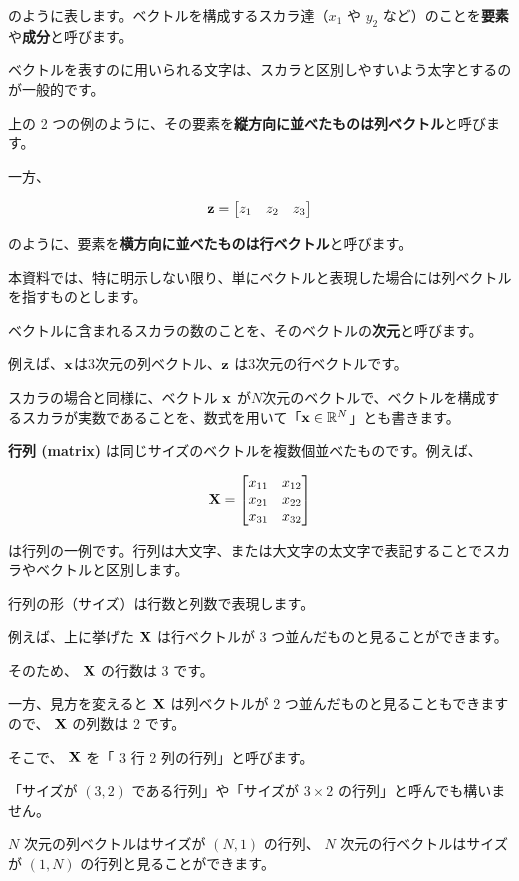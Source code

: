のように表します。ベクトルを構成するスカラ達（$x_1$ や $y_2$ など）のことを\textbf{要素}や\textbf{成分}と呼びます。

ベクトルを表すのに用いられる文字は、スカラと区別しやすいよう太字とするのが一般的です。

上の 2 つの例のように、その要素を\textbf{縦方向に並べたものは列ベクトル}と呼びます。

一方、


\[
{\bf z}=\begin{bmatrix}
z_{1} & z_{2} & z_{3}
\end{bmatrix}
\]


のように、要素を\textbf{横方向に並べたものは行ベクトル}と呼びます。

本資料では、特に明示しない限り、単にベクトルと表現した場合には列ベクトルを指すものとします。

ベクトルに含まれるスカラの数のことを、そのベクトルの\textbf{次元}と呼びます。

例えば、${\bf x}$は3次元の列ベクトル、${\bf z}$ は3次元の行ベクトルです。

スカラの場合と同様に、ベクトル ${\bf x}$ が$N$次元のベクトルで、ベクトルを構成するスカラが実数であることを、数式を用いて「${\bf x}\in \mathbb{R}^N$」とも書きます。


\textbf{行列 (matrix)} は同じサイズのベクトルを複数個並べたものです。例えば、


\[
{\bf X} =
\begin{bmatrix}
x_{11} & x_{12} \\
x_{21} & x_{22} \\
x_{31} & x_{32}
\end{bmatrix}
\]


は行列の一例です。行列は大文字、または大文字の太文字で表記することでスカラやベクトルと区別します。

行列の形（サイズ）は行数と列数で表現します。

例えば、上に挙げた ${\bf X}$ は行ベクトルが 3 つ並んだものと見ることができます。

そのため、 ${\bf X}$ の行数は 3 です。

一方、見方を変えると ${\bf X}$ は列ベクトルが 2 つ並んだものと見ることもできますので、 ${\bf X}$ の列数は 2 です。

そこで、 ${\bf X}$ を「 3 行 2 列の行列」と呼びます。

「サイズが $(3, 2)$ である行列」や「サイズが $3\times 2$ の行列」と呼んでも構いません。

$N$ 次元の列ベクトルはサイズが $(N, 1)$ の行列、 $N$ 次元の行ベクトルはサイズが $(1, N)$ の行列と見ることができます。

